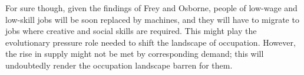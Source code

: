 \documentclass[12pt]{article}
\begin{document}
For sure though, given the findings of Frey and Osborne, people of low-wage and low-skill jobs will be soon replaced by machines, and they will have to migrate to jobs where creative and social skills are required. This might play the evolutionary pressure role needed to shift the landscape of occupation. However, the rise in supply might not be met by corresponding demand; this will undoubtedly render the occupation landscape barren for them.






\end{document}
